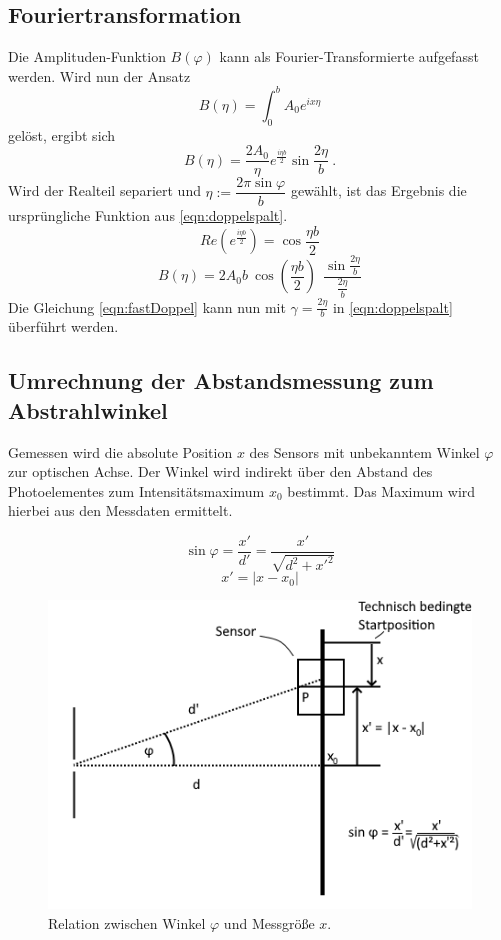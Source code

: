 \subsection{Fouriertransformation}
Die Amplituden-Funktion $B(\varphi)$ kann als Fourier-Transformierte aufgefasst werden.
Wird nun der Ansatz
\begin{equation}
  B(\eta) = \int_{0}^{b}A_0e^{ix\eta}
\end{equation}
gelöst, ergibt sich
\begin{equation}
  B(\eta) = \frac{2A_0}{\eta}e^{\frac{i\eta b}{2}}\sin{\frac{2\eta}{b}} \:.
\end{equation}
Wird der Realteil separiert und $\eta := \dfrac{2\pi \sin{\varphi}}{b}$ gewählt, ist das Ergebnis die ursprüngliche Funktion aus \eqref{eqn:doppelspalt}.
\begin{equation}
  Re(e^{\frac{i\eta b}{2}}) = \cos{\frac{\eta b}{2}}
\end{equation}
\begin{equation}
  B(\eta) = 2A_0b\:\cos{(\frac{\eta b}{2})}\:\:\frac{\sin{\frac{2\eta}{b}}}{\frac{2\eta}{b}}
  \label{eqn:fastDoppel}
\end{equation}
Die Gleichung \eqref{eqn:fastDoppel} kann nun mit $\gamma = \frac{2\eta}{b}$ in \eqref{eqn:doppelspalt} überführt werden.

\subsection{Umrechnung der Abstandsmessung zum Abstrahlwinkel}
Gemessen wird die absolute Position $x$ des Sensors mit unbekanntem Winkel $\varphi$ zur optischen Achse.
Der Winkel wird indirekt über den Abstand des Photoelementes zum Intensitätsmaximum $x_0$ bestimmt.
Das Maximum wird hierbei aus den Messdaten ermittelt.

\begin{equation}
  \sin{\varphi} = \frac{x'}{d'} = \frac{x'}{\sqrt{d^2+x'^2}}
\end{equation}
\begin{equation}
  x' = |x-x_0|
\end{equation}

\begin{figure}
  \centering
  \includegraphics[width=.8\textwidth]{plots/x_to_angle.png}
  \caption{Relation zwischen Winkel $\varphi$ und Messgröße $x$.}
  \label{fig:xToAngle}
\end{figure}